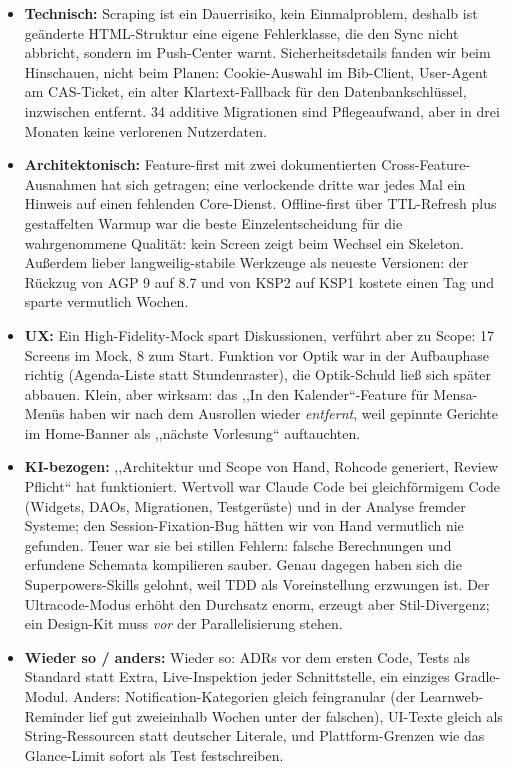 \documentclass{msereport}
\begin{document}
\begin{itemize}
  \item \textbf{Technisch:} Scraping ist ein Dauerrisiko, kein Einmalproblem,
        deshalb ist geänderte HTML-Struktur eine eigene Fehlerklasse, die den
        Sync nicht abbricht, sondern im Push-Center warnt. Sicherheitsdetails
        fanden wir beim Hinschauen, nicht beim Planen: Cookie-Auswahl im
        Bib-Client, User-Agent am CAS-Ticket, ein alter Klartext-Fallback für den
        Datenbankschlüssel, inzwischen entfernt. 34 additive Migrationen sind
        Pflegeaufwand, aber in drei Monaten keine verlorenen Nutzerdaten.
  \item \textbf{Architektonisch:} Feature-first mit zwei dokumentierten
        Cross-Feature-Ausnahmen hat sich getragen; eine verlockende dritte war
        jedes Mal ein Hinweis auf einen fehlenden Core-Dienst. Offline-first über
        TTL-Refresh plus gestaffelten Warmup war die beste Einzelentscheidung für
        die wahrgenommene Qualität: kein Screen zeigt beim Wechsel ein Skeleton.
        Außerdem lieber langweilig-stabile Werkzeuge als neueste Versionen: der
        Rückzug von AGP 9 auf 8.7 und von KSP2 auf KSP1 kostete einen Tag und
        sparte vermutlich Wochen.
  \item \textbf{UX:} Ein High-Fidelity-Mock spart Diskussionen, verführt aber zu
        Scope: 17 Screens im Mock, 8 zum Start. Funktion vor Optik war in der
        Aufbauphase richtig (Agenda-Liste statt Stundenraster), die Optik-Schuld
        ließ sich später abbauen. Klein, aber wirksam: das ,,In den
        Kalender``-Feature für Mensa-Menüs haben wir nach dem Ausrollen wieder
        \emph{entfernt}, weil gepinnte Gerichte im Home-Banner als ,,nächste
        Vorlesung`` auftauchten.
  \item \textbf{KI-bezogen:} ,,Architektur und Scope von Hand, Rohcode generiert,
        Review Pflicht`` hat funktioniert. Wertvoll war Claude Code bei
        gleichförmigem Code (Widgets, DAOs, Migrationen, Testgerüste) und in der
        Analyse fremder Systeme; den Session-Fixation-Bug hätten wir von Hand
        vermutlich nie gefunden. Teuer war sie bei stillen Fehlern: falsche
        Berechnungen und erfundene Schemata kompilieren sauber. Genau dagegen
        haben sich die Superpowers-Skills gelohnt, weil TDD als Voreinstellung
        erzwungen ist. Der Ultracode-Modus erhöht den Durchsatz enorm, erzeugt
        aber Stil-Divergenz; ein Design-Kit muss \emph{vor} der Parallelisierung
        stehen.
  \item \textbf{Wieder so / anders:} Wieder so: ADRs vor dem ersten Code, Tests
        als Standard statt Extra, Live-Inspektion jeder Schnittstelle, ein
        einziges Gradle-Modul. Anders: Notification-Kategorien gleich feingranular
        (der Learnweb-Reminder lief gut zweieinhalb Wochen unter der falschen),
        UI-Texte gleich als String-Ressourcen statt deutscher Literale, und
        Plattform-Grenzen wie das Glance-Limit sofort als Test festschreiben.
\end{itemize}
\end{document}
